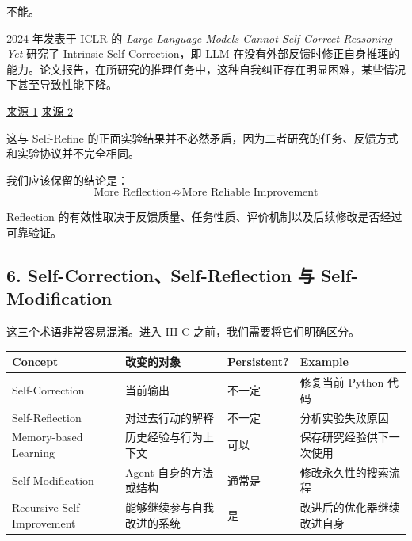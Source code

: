 不能。

2024 年发表于 ICLR 的 \emph{Large Language Models Cannot Self-Correct Reasoning Yet} 研究了 Intrinsic Self-Correction，即 LLM 在没有外部反馈时修正自身推理的能力。论文报告，在所研究的推理任务中，这种自我纠正存在明显困难，某些情况下甚至导致性能下降。

\href{https://proceedings.iclr.cc/paper_files/paper/2024/hash/8b4add8b0aa8749d80a34ca5d941c355-Abstract-Conference.html}{来源 1} \href{https://openreview.net/forum?id=IkmD3fKBPQ}{来源 2}

这与 Self-Refine 的正面实验结果并不必然矛盾，因为二者研究的任务、反馈方式和实验协议并不完全相同。

我们应该保留的结论是：
\[\boxed{
\text{More Reflection}
\not\Rightarrow
\text{More Reliable Improvement}
}\]

Reflection 的有效性取决于反馈质量、任务性质、评价机制以及后续修改是否经过可靠验证。

\hypertarget{part-3-34-0001-self-correctionself-reflection-ux4e0e-self-modification}{%
\subsection{6. Self-Correction、Self-Reflection 与 Self-Modification}\label{part-3-34-0001-self-correctionself-reflection-ux4e0e-self-modification}}

这三个术语非常容易混淆。进入 III-C 之前，我们需要将它们明确区分。

\begin{readertable}
\begin{longtable}[]{@{}
  >{\raggedright\arraybackslash}p{}
  >{\raggedright\arraybackslash}p{}
  >{\raggedright\arraybackslash}p{}
  >{\raggedright\arraybackslash}p{}@{}}
\toprule
Concept & 改变的对象 & Persistent? & Example \\
\midrule
\endhead
Self-Correction & 当前输出 & 不一定 & 修复当前 Python 代码 \\
Self-Reflection & 对过去行动的解释 & 不一定 & 分析实验失败原因 \\
Memory-based Learning & 历史经验与行为上下文 & 可以 & 保存研究经验供下一次使用 \\
Self-Modification & Agent 自身的方法或结构 & 通常是 & 修改永久性的搜索流程 \\
Recursive Self-Improvement & 能够继续参与自我改进的系统 & 是 & 改进后的优化器继续改进自身 \\
\bottomrule
\end{longtable}
\end{readertable}

